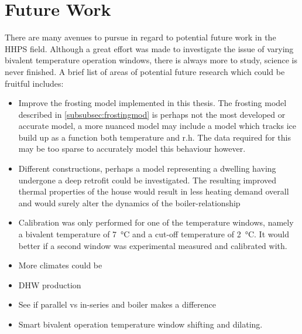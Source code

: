 \section{Future Work}
There are many avenues to pursue in regard to potential future work in the \ac{HHPS} field. Although a great effort was made to investigate the issue of varying bivalent temperature operation windows, there is always more to study, science is never finished. A brief list of areas of potential future research which could be fruitful includes:
\begin{itemize}
    \item Improve the frosting model implemented in this thesis. The frosting model described in \cref{subsubsec:frostingmod} is perhaps not the most developed or accurate model, a more nuanced model may include a model which tracks ice build up as a function both temperature and r.h. The data required for this may be too sparse to accurately model this behaviour however.
    \item Different constructions, perhaps a model representing a dwelling having undergone a deep retrofit could be investigated. The resulting improved thermal properties of the house would result in less heating demand overall and would surely alter the dynamics of the boiler-\HP relationship
    \item Calibration was only performed for one of the temperature windows, namely a bivalent temperature of \qty{7}{\celsius} and a cut-off temperature of \qty{2}{\celsius}. It would better if a second window was experimental measured and calibrated with. 
    \item More climates could be 
    \item DHW production
    \item See if parallel vs in-series \HP and boiler makes a difference
    \item Smart bivalent operation temperature window shifting and dilating. 
\end{itemize}

